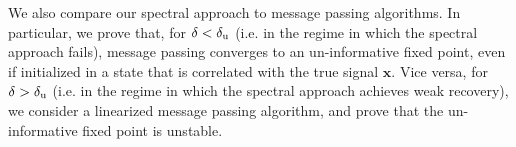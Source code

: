 \documentclass[final,12pt]{colt2018}
\def\ba{{\boldsymbol a}}
\def\bx{{\boldsymbol x}}
\begin{document}
We also compare our spectral approach to message passing algorithms. In particular, we prove that, for $\delta<\delta_{\rm u}$ (i.e. in the regime in which the spectral approach fails), message passing converges to an un-informative fixed point, even if initialized in a state that is correlated with the true signal $\bx$. Vice versa, for $\delta>\delta_{\rm u}$ (i.e. in the regime in which the spectral approach achieves weak recovery), we consider a linearized message passing algorithm, and prove that the un-informative fixed point is unstable.





\end{document}
